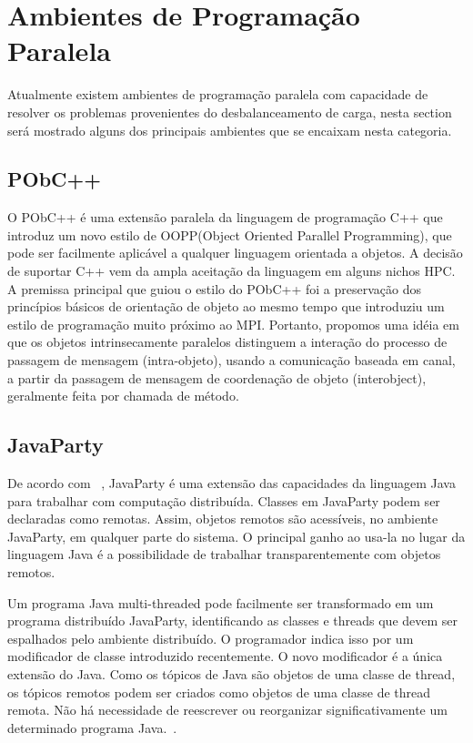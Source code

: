 \section{Ambientes de Programação Paralela}
\label{ambientes-de-programacao-paralela}
Atualmente existem ambientes de programação paralela com capacidade de resolver os problemas provenientes do desbalanceamento de carga, nesta section será mostrado alguns dos principais ambientes que se encaixam nesta categoria.

\subsection{PObC++}
\label{pobc++}
O PObC++ \cite{pinholanguage} é uma extensão paralela da linguagem de programação C++ que introduz um novo estilo de OOPP(Object Oriented Parallel Programming), que pode ser facilmente aplicável a qualquer linguagem orientada a objetos. A decisão de suportar C++ vem da ampla aceitação da linguagem em alguns nichos HPC. A premissa principal que guiou o estilo do PObC++ foi a preservação dos princípios básicos de orientação de objeto ao mesmo tempo que introduziu um estilo de programação muito próximo ao MPI. Portanto, propomos uma idéia em que os objetos intrinsecamente paralelos distinguem a interação do processo de passagem de mensagem (intra-objeto), usando a comunicação baseada em canal, a partir da passagem de mensagem de coordenação de objeto (interobject), geralmente feita por chamada de método.

\subsection{JavaParty}
\label{javaparty}
De acordo com ~\cite{pinho2012linguagem}, JavaParty é uma extensão das capacidades da linguagem Java para trabalhar com computação distribuída. Classes em JavaParty podem ser declaradas como remotas. Assim, objetos remotos são acessíveis, no ambiente JavaParty, em qualquer parte do sistema. O principal ganho ao usa-la no lugar da linguagem Java é a possibilidade de trabalhar transparentemente com objetos remotos.
	
Um programa Java multi-threaded pode facilmente ser transformado em um programa distribuído JavaParty, identificando as classes e threads que devem ser espalhados pelo ambiente distribuído. O programador indica isso por um modificador de classe introduzido recentemente. O novo modificador é a única extensão do Java. Como os tópicos de Java são objetos de uma classe de thread, os tópicos remotos podem ser criados como objetos de uma classe de thread remota. Não há necessidade de reescrever ou reorganizar significativamente um determinado programa Java.~\cite{philippsen1997javaparty}.

